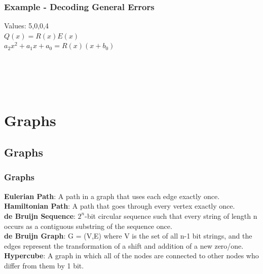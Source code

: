 \documentclass[9pt]{beamer}
\begin{document}
\begin{frame}[fragile]
  \frametitle{Example - Decoding General Errors} 
{\small
Values: 5,0,0,4 \\ \vspace{3.0mm}
$Q(x) = R(x)E(x)$ \\ \vspace{0.5mm}
$a_2x^2 + a_1x + a_0 = R(x)(x + b_0)$ \\ \vspace{3.0mm}
\\ \vspace{3.0mm}
 \\ \vspace{0.5mm}
 \\ \vspace{0.5mm}
 \\ \vspace{3.0mm}
}
\end{frame}


\section{Graphs}
\subsection{Graphs}

\begin{frame}[fragile]
  \frametitle{Graphs}
{\bf Eulerian Path}: A path in a graph that uses each edge exactly once.\\
{\bf Hamiltonian Path}: A path that goes through every vertex exactly once.\\
{\bf de Bruijn Sequence}: $2^n$-bit circular sequence such that every string of length n occurs as a contiguous substring of the sequence once.\\
{\bf de Bruijn Graph}: G = (V,E) where V is the set of all n-1 bit strings, and the edges represent the transformation of a shift and addition of a new zero/one.\\
{\bf Hypercube}: A graph in which all of the nodes are connected to other nodes who differ from them by 1 bit.
\end{frame}
\end{document}
